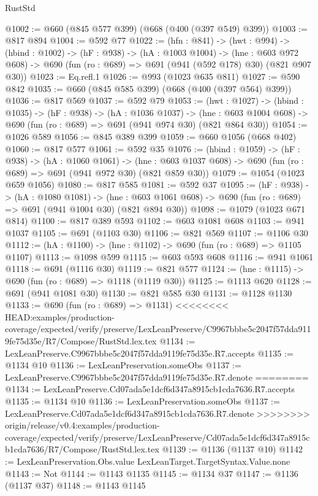 \begin{lexlean}{RustStd}
\begin{coremodule}
{\begin{coremodule}
@1002 := @660 (@845 @577 @399) (@668 (@400 (@397 @549) @399))
@1003 := @817 @894
@1004 := @592 @77
@1022 := (hfn : @841) ->
  (hwt : @994) ->
  (hbind : @1002) ->
  (hF : @938) ->
  (hA : @1003 @1004) ->
  (hne : @603 @972 @608) -> @690 (fun (ro : @689) => @691 (@941 (@592 @178) @30) (@821 @907 @30))
@1023 := Eq.refl.{1}
@1026 := @993 (@1023 @635 @811)
@1027 := @590 @842
@1035 := @660 (@845 @585 @399) (@668 (@400 (@397 @564) @399))
@1036 := @817 @569
@1037 := @592 @79
@1053 := (hwt : @1027) ->
  (hbind : @1035) ->
  (hF : @938) ->
  (hA : @1036 @1037) ->
  (hne : @603 @1004 @608) -> @690 (fun (ro : @689) => @691 (@941 @974 @30) (@821 @864 @30))
@1054 := @1026 @589
@1056 := @845 @389 @399
@1059 := @660 @1056 (@668 @402)
@1060 := @817 @577
@1061 := @592 @35
@1076 := (hbind : @1059) ->
  (hF : @938) ->
  (hA : @1060 @1061) ->
  (hne : @603 @1037 @608) -> @690 (fun (ro : @689) => @691 (@941 @972 @30) (@821 @859 @30))
@1079 := @1054 (@1023 @659 @1056)
@1080 := @817 @585
@1081 := @592 @37
@1095 := (hF : @938) ->
  (hA : @1080 @1081) ->
  (hne : @603 @1061 @608) -> @690 (fun (ro : @689) => @691 (@941 @1004 @30) (@821 @894 @30))
@1098 := @1079 (@1023 @671 @814)
@1100 := @817 @389 @593
@1102 := @603 @1081 @608
@1103 := @941 @1037
@1105 := @691 (@1103 @30)
@1106 := @821 @569
@1107 := @1106 @30
@1112 := (hA : @1100) -> (hne : @1102) -> @690 (fun (ro : @689) => @1105 @1107)
@1113 := @1098 @599
@1115 := @603 @593 @608
@1116 := @941 @1061
@1118 := @691 (@1116 @30)
@1119 := @821 @577
@1124 := (hne : @1115) -> @690 (fun (ro : @689) => @1118 (@1119 @30))
@1125 := @1113 @620
@1128 := @691 (@941 @1081 @30)
@1130 := @821 @585 @30
@1131 := @1128 @1130
@1133 := @690 (fun (ro : @689) => @1131)
<<<<<<<< HEAD:examples/production-coverage/expected/verify/preserve/LexLeanPreserve/C9967bbbe5c2047f57dda9119fe75d35e/R7/Compose/RustStd.lex.tex
@1134 := LexLeanPreserve.C9967bbbe5c2047f57dda9119fe75d35e.R7.accepts
@1135 := @1134 @10
@1136 := LexLeanPreservation.someObs
@1137 := LexLeanPreserve.C9967bbbe5c2047f57dda9119fe75d35e.R7.denote
========
@1134 := LexLeanPreserve.Cd07ada5e1dcf6d347a8915cb1cda7636.R7.accepts
@1135 := @1134 @10
@1136 := LexLeanPreservation.someObs
@1137 := LexLeanPreserve.Cd07ada5e1dcf6d347a8915cb1cda7636.R7.denote
>>>>>>>> origin/release/v0.4:examples/production-coverage/expected/verify/preserve/LexLeanPreserve/Cd07ada5e1dcf6d347a8915cb1cda7636/R7/Compose/RustStd.lex.tex
@1139 := @1136 (@1137 @10)
@1142 := LexLeanPreservation.Obs.value LexLeanTarget.TargetSyntax.Value.none
@1143 := Not
@1144 := @1143 @1135
@1145 := @1134 @37
@1147 := @1136 (@1137 @37)
@1148 := @1143 @1145

\end{coremodule}}
\end{coremodule}
\end{lexlean}
